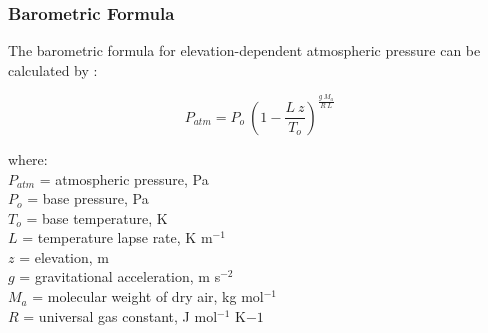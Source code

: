 \subsubsection{Barometric Formula}
\label{sec:atm}
The barometric formula for elevation-dependent atmospheric pressure can be calculated by \parencite{allen98}:

\begin{equation}
\label{eq:atm}
	P_{atm} = P_o \: \left(1 - \frac{L \: z}{T_o}\right)^{\frac{g\: M_a}{R\: L}}
\end{equation}

\noindent where: \\
\indent $P_{atm}$ = atmospheric pressure, Pa \\
\indent $P_o$ = base pressure, Pa \\
\indent $T_o$ = base temperature, K \\
\indent $L$ = temperature lapse rate, K m$^{-1}$ \\
\indent $z$ = elevation, m \\
\indent $g$ = gravitational acceleration, m s$^{-2}$ \\
\indent $M_a$ = molecular weight of dry air, kg mol$^{-1}$ \\
\indent $R$ = universal gas constant, J mol$^{-1}$ K${-1}$ \\

